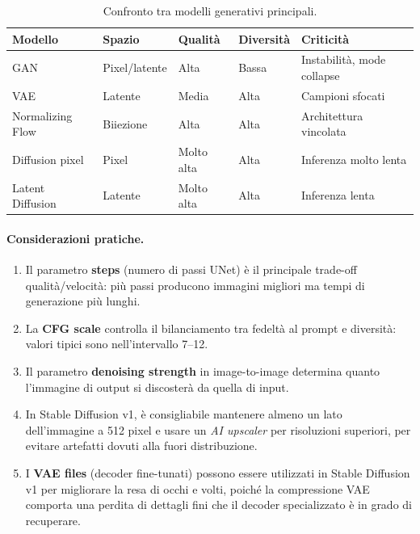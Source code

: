 \begin{table}[H]
  \centering
  \caption{Confronto tra modelli generativi principali.}
  \label{tab:diffusion-comparison}
  \small
  \begin{tabularx}{\linewidth}{l l l l X}
    \toprule
    \textbf{Modello} & \textbf{Spazio}
      & \textbf{Qualità} & \textbf{Diversità} & \textbf{Criticità} \\
    \midrule
    GAN              & Pixel/latente & Alta           & Bassa         & Instabilità, mode collapse \\
    VAE              & Latente       & Media          & Alta          & Campioni sfocati \\
    Normalizing Flow & Biiezione     & Alta           & Alta          & Architettura vincolata \\
    Diffusion pixel  & Pixel         & Molto alta     & Alta          & Inferenza molto lenta \\
    Latent Diffusion & Latente       & Molto alta     & Alta          & Inferenza lenta \\
    \bottomrule
  \end{tabularx}
\end{table}

\paragraph{Considerazioni pratiche.}
\begin{enumerate}
  \item Il parametro \textbf{steps} (numero di passi UNet) è il
        principale trade-off qualità/velocità: più passi producono
        immagini migliori ma tempi di generazione più lunghi.
  \item La \textbf{CFG scale} controlla il bilanciamento tra fedeltà
        al prompt e diversità: valori tipici sono nell'intervallo 7--12.
  \item Il parametro \textbf{denoising strength} in image-to-image
        determina quanto l'immagine di output si discosterà da quella
        di input.
  \item In Stable Diffusion v1, è consigliabile mantenere almeno un
        lato dell'immagine a 512 pixel e usare un \emph{AI upscaler}
        per risoluzioni superiori, per evitare artefatti dovuti alla
        fuori distribuzione.
  \item I \textbf{VAE files} (decoder fine-tunati) possono essere
        utilizzati in Stable Diffusion v1 per migliorare la resa di
        occhi e volti, poiché la compressione VAE comporta una perdita
        di dettagli fini che il decoder specializzato è in grado di
        recuperare.
\end{enumerate}
